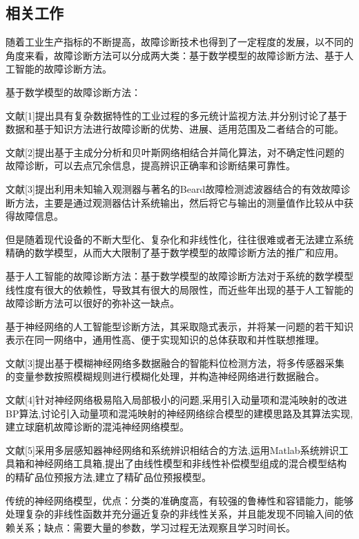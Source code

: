 \documentclass{ctacn}%
\begin{document}
\begin{multicols}{2}

\section{相关工作}
随着工业生产指标的不断提高，故障诊断技术也得到了一定程度的发展，以不同的角度来看，故障诊断方法可以分成两大类：基于数学模型的故障诊断方法、基于人工智能的故障诊断方法。

基于数学模型的故障诊断方法：

文献[1]提出具有复杂数据特性的工业过程的多元统计监视方法,并分别讨论了基于数据和基于知识方法进行故障诊断的优势、进展、适用范围及二者结合的可能。

文献[2]提出基于主成分分析和贝叶斯网络相结合并简化算法，对不确定性问题的故障诊断，可以去点冗余信息，提高辨识正确率和诊断结果可靠性。

文献[3]提出利用未知输入观测器与著名的Beard故障检测滤波器结合的有效故障诊断方法，主要是通过观测器估计系统输出，然后将它与输出的测量值作比较从中获得故障信息。

但是随着现代设备的不断大型化、复杂化和非线性化，往往很难或者无法建立系统精确的数学模型，从而大大限制了基于数学模型的故障诊断方法的推广和应用。

基于人工智能的故障诊断方法：基于数学模型的故障诊断方法对于系统的数学模型线性度有很大的依赖性，导致其有很大的局限性，而近些年出现的基于人工智能的故障诊断方法可以很好的弥补这一缺点。

基于神经网络的人工智能型诊断方法，其采取隐式表示，并将某一问题的若干知识表示在同一网络中，通用性高、便于实现知识的总体获取和并性联想推理。

文献[3]提出基于模糊神经网络多数据融合的智能料位检测方法，将多传感器采集的变量参数按照模糊规则进行模糊化处理，并构造神经网络进行数据融合。

文献[4]针对神经网络极易陷入局部极小的问题,采用引入动量项和混沌映射的改进BP算法,讨论引入动量项和混沌映射的神经网络综合模型的建模思路及其算法实现,建立球磨机故障诊断的混沌神经网络模型。

文献[5]采用多层感知器神经网络和系统辨识相结合的方法,运用Matlab系统辨识工具箱和神经网络工具箱,提出了由线性模型和非线性补偿模型组成的混合模型结构的精矿品位预报方法,建立了精矿品位预报模型。

传统的神经网络模型，优点：分类的准确度高，有较强的鲁棒性和容错能力，能够处理复杂的非线性函数并充分逼近复杂的非线性关系，并且能发现不同输入间的依赖关系；缺点：需要大量的参数，学习过程无法观察且学习时间长。


\end{multicols}
\end{document}
